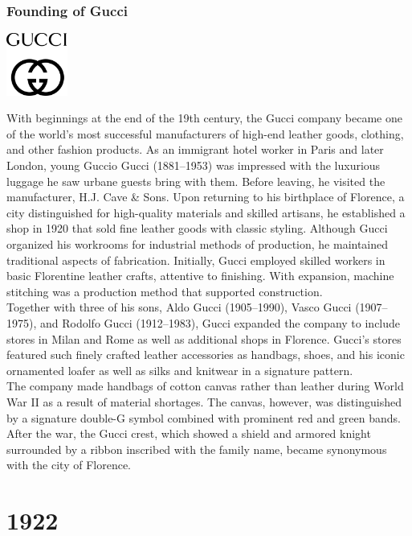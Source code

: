 \documentclass[11pt]{report}
\begin{document}
\subsection{Founding of Gucci}
\vspace{2mm}\begin{center}\includegraphics[width=2cm]{./img/gucciLogo.jpg}\end{center}
With beginnings at the end of the 19th century, the Gucci company became one of the world’s most successful manufacturers of high-end leather goods, clothing, and other fashion products. As an immigrant hotel worker in Paris and later London, young Guccio Gucci (1881–1953) was impressed with the luxurious luggage he saw urbane guests bring with them. Before leaving, he visited the manufacturer, H.J. Cave \& Sons. Upon returning to his birthplace of Florence, a city distinguished for high-quality materials and skilled artisans, he established a shop in 1920 that sold fine leather goods with classic styling. Although Gucci organized his workrooms for industrial methods of production, he maintained traditional aspects of fabrication. Initially, Gucci employed skilled workers in basic Florentine leather crafts, attentive to finishing. With expansion, machine stitching was a production method that supported construction.\\
\indent Together with three of his sons, Aldo Gucci (1905–1990), Vasco Gucci (1907–1975), and Rodolfo Gucci (1912–1983), Gucci expanded the company to include stores in Milan and Rome as well as additional shops in Florence. Gucci's stores featured such finely crafted leather accessories as handbags, shoes, and his iconic ornamented loafer as well as silks and knitwear in a signature pattern.\\
\indent The company made handbags of cotton canvas rather than leather during World War II as a result of material shortages. The canvas, however, was distinguished by a signature double-G symbol combined with prominent red and green bands. After the war, the Gucci crest, which showed a shield and armored knight surrounded by a ribbon inscribed with the family name, became synonymous with the city of Florence.

\chapter{1922}
\end{document}
